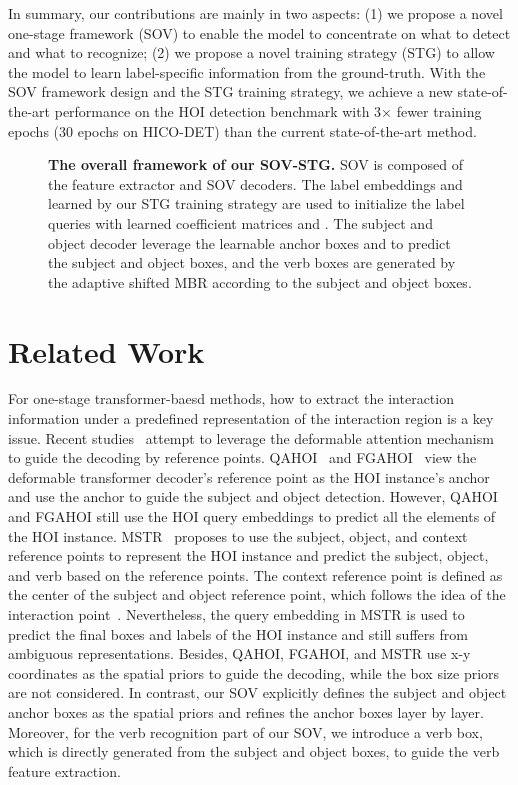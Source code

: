 \documentclass[10pt,twocolumn,letterpaper]{article}
\begin{document}
In summary, our contributions are mainly in two aspects: (1) we propose a novel one-stage framework (SOV) to enable the model to concentrate on what to detect and what to recognize;
(2) we propose a novel training strategy (STG) to allow the model to learn label-specific information from the ground-truth.
With the SOV framework design and the STG training strategy, we achieve a new state-of-the-art performance on the HOI detection benchmark with 3× fewer training epochs (30 epochs on HICO-DET) than the current state-of-the-art method.



\begin{figure*}[!ht]
    \centering
    \caption{
        \textbf{The overall framework of our SOV-STG.}
        SOV is composed of the feature extractor and SOV decoders.
The label embeddings  and  learned by our STG training strategy are used to initialize the label queries  with learned coefficient matrices  and .
        The subject and object decoder leverage the learnable anchor boxes  and  to predict the subject and object boxes, and the verb boxes  are generated by the adaptive shifted MBR according to the subject and object boxes.
}
    \label{fig:overall_architecture}
\end{figure*}

\section{Related Work}
\quad For one-stage transformer-baesd methods, how to extract the interaction information under a predefined representation of the interaction region is a key issue.
Recent studies~\cite{cjw_qahoi,ma2023fgahoi,Kim_2022_CVPR} attempt to leverage the deformable attention mechanism~\cite{zhu2020deformable} to guide the decoding by reference points.
QAHOI~\cite{cjw_qahoi} and FGAHOI~\cite{ma2023fgahoi} view the deformable transformer decoder's reference point as the HOI instance's anchor and use the anchor to guide the subject and object detection.
However, QAHOI and FGAHOI still use the HOI query embeddings to predict all the elements of the HOI instance.
MSTR~\cite{Kim_2022_CVPR} proposes to use the subject, object, and context reference points to represent the HOI instance and predict the subject, object, and verb based on the reference points.
The context reference point is defined as the center of the subject and object reference point, which follows the idea of the interaction point~\cite{liao2020ppdm,wang2020learning,zhong2021glance}.
Nevertheless, the query embedding in MSTR is used to predict the final boxes and labels of the HOI instance and still suffers from ambiguous representations.
Besides, QAHOI, FGAHOI, and MSTR use x-y coordinates as the spatial priors to guide the decoding, while the box size priors are not considered.
In contrast, our SOV explicitly defines the subject and object anchor boxes as the spatial priors and refines the anchor boxes layer by layer.
Moreover, for the verb recognition part of our SOV, we introduce a verb box, which is directly generated from the subject and object boxes, to guide the verb feature extraction.
\end{document}
